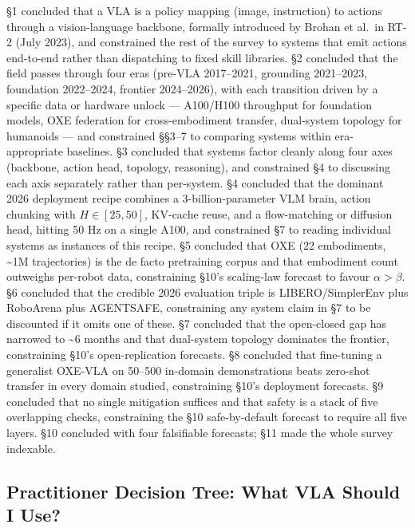 \documentclass{article}
\begin{document}
§1 concluded that a VLA is a policy mapping (image, instruction) to actions through a vision-language backbone, formally introduced by Brohan et al.~in RT-2 (July 2023), and constrained the rest of the survey to systems that emit actions end-to-end rather than dispatching to fixed skill libraries. §2 concluded that the field passes through four eras (pre-VLA 2017--2021, grounding 2021--2023, foundation 2022--2024, frontier 2024--2026), with each transition driven by a specific data or hardware unlock --- A100/H100 throughput for foundation models, OXE federation for cross-embodiment transfer, dual-system topology for humanoids --- and constrained §§3--7 to comparing systems within era-appropriate baselines. §3 concluded that systems factor cleanly along four axes (backbone, action head, topology, reasoning), and constrained §4 to discussing each axis separately rather than per-system. §4 concluded that the dominant 2026 deployment recipe combines a 3-billion-parameter VLM brain, action chunking with \(H \in [25, 50]\), KV-cache reuse, and a flow-matching or diffusion head, hitting 50 Hz on a single A100, and constrained §7 to reading individual systems as instances of this recipe. §5 concluded that OXE (22 embodiments, \textasciitilde1M trajectories) is the de facto pretraining corpus and that embodiment count outweighs per-robot data, constraining §10's scaling-law forecast to favour \(\alpha > \beta\). §6 concluded that the credible 2026 evaluation triple is LIBERO/SimplerEnv plus RoboArena plus AGENTSAFE, constraining any system claim in §7 to be discounted if it omits one of these. §7 concluded that the open-closed gap has narrowed to \textasciitilde6 months and that dual-system topology dominates the frontier, constraining §10's open-replication forecasts. §8 concluded that fine-tuning a generalist OXE-VLA on 50--500 in-domain demonstrations beats zero-shot transfer in every domain studied, constraining §10's deployment forecasts. §9 concluded that no single mitigation suffices and that safety is a stack of five overlapping checks, constraining the §10 safe-by-default forecast to require all five layers. §10 concluded with four falsifiable forecasts; §11 made the whole survey indexable.

\subsection{Practitioner Decision Tree: What VLA Should I Use?}\label{practitioner-decision-tree-what-vla-should-i-use}
\end{document}
